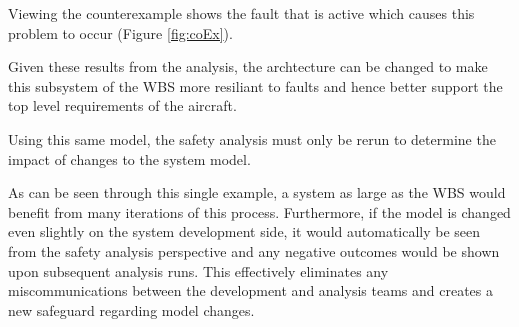 Viewing the counterexample shows the fault that is active which causes this problem to occur (Figure \ref{fig:coEx}).

Given these results from the analysis, the archtecture can be changed to make this subsystem of the WBS more resiliant to faults and hence better support the top level requirements of the aircraft. 

Using this same model, the safety analysis must only be rerun to determine the impact of changes to the system model.  

As can be seen through this single example, a system as large as the WBS would benefit from many iterations of this process. Furthermore, if the model is changed even slightly on the system development side, it would automatically be seen from the safety analysis perspective and any negative outcomes would be shown upon subsequent analysis runs. This effectively eliminates any miscommunications between the development and analysis teams and creates a new safeguard regarding model changes. 



